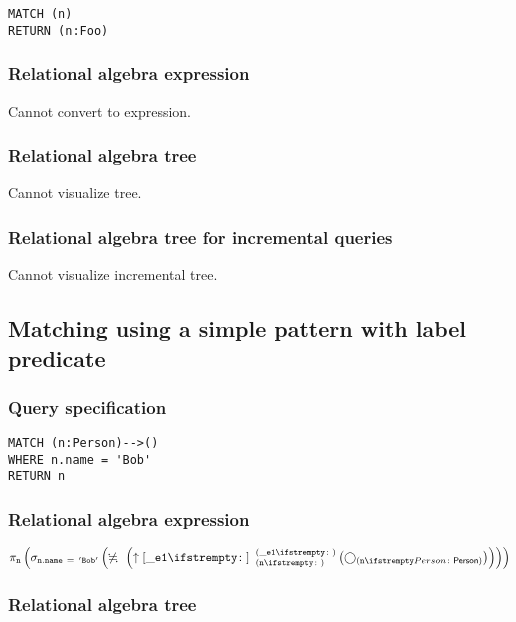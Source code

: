 \begin{lstlisting}
MATCH (n)
RETURN (n:Foo)
\end{lstlisting}

\subsubsection*{Relational algebra expression}

Cannot convert to expression.

\subsubsection*{Relational algebra tree}

Cannot visualize tree.

\subsubsection*{Relational algebra tree for incremental queries}

Cannot visualize incremental tree.

\subsection{Matching using a simple pattern with label predicate}

\subsubsection*{Query specification}

\begin{lstlisting}
MATCH (n:Person)-->()
WHERE n.name = 'Bob'
RETURN n
\end{lstlisting}

\subsubsection*{Relational algebra expression}

$\projection{\var{n}} \left(\selection{\mathtt{n.name~=~'Bob'}} \left(\alldifferent{} \left(\expandout{\_e1}{}{n}{\_e1}{} \left(\getvertices{n}{Person}\right)\right)\right)\right)$

\subsubsection*{Relational algebra tree}


